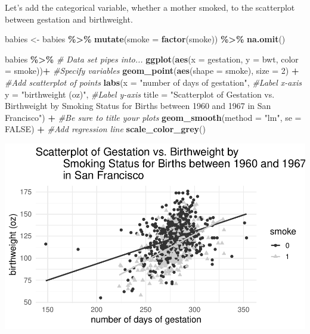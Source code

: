 \documentclass[
]{report}
\newenvironment{Shaded}{\begin{snugshade}}{\end{snugshade}}
\newcommand{\AttributeTok}[1]{\textcolor[rgb]{0.13,0.29,0.53}{#1}}
\newcommand{\CommentTok}[1]{\textcolor[rgb]{0.56,0.35,0.01}{\textit{#1}}}
\newcommand{\ConstantTok}[1]{\textcolor[rgb]{0.56,0.35,0.01}{#1}}
\newcommand{\DecValTok}[1]{\textcolor[rgb]{0.00,0.00,0.81}{#1}}
\newcommand{\FunctionTok}[1]{\textcolor[rgb]{0.13,0.29,0.53}{\textbf{#1}}}
\newcommand{\NormalTok}[1]{#1}
\newcommand{\OtherTok}[1]{\textcolor[rgb]{0.56,0.35,0.01}{#1}}
\newcommand{\SpecialCharTok}[1]{\textcolor[rgb]{0.81,0.36,0.00}{\textbf{#1}}}
\newcommand{\StringTok}[1]{\textcolor[rgb]{0.31,0.60,0.02}{#1}}
\begin{document}
\newpage

Let's add the categorical variable, whether a mother smoked, to the scatterplot between gestation and birthweight.

\begin{Shaded}
\begin{Highlighting}[]
\NormalTok{babies }\OtherTok{\textless{}{-}}\NormalTok{ babies }\SpecialCharTok{\%\textgreater{}\%} 
    \FunctionTok{mutate}\NormalTok{(}\AttributeTok{smoke =} \FunctionTok{factor}\NormalTok{(smoke)) }\SpecialCharTok{\%\textgreater{}\%}
    \FunctionTok{na.omit}\NormalTok{()}
           
\NormalTok{babies }\SpecialCharTok{\%\textgreater{}\%} \CommentTok{\# Data set pipes into...}
    \FunctionTok{ggplot}\NormalTok{(}\FunctionTok{aes}\NormalTok{(}\AttributeTok{x =}\NormalTok{ gestation, }\AttributeTok{y =}\NormalTok{ bwt, }\AttributeTok{color =}\NormalTok{ smoke))}\SpecialCharTok{+}  \CommentTok{\#Specify variables}
    \FunctionTok{geom\_point}\NormalTok{(}\FunctionTok{aes}\NormalTok{(}\AttributeTok{shape =}\NormalTok{ smoke), }\AttributeTok{size =} \DecValTok{2}\NormalTok{) }\SpecialCharTok{+}  \CommentTok{\#Add scatterplot of points}
    \FunctionTok{labs}\NormalTok{(}\AttributeTok{x =} \StringTok{"number of days of gestation"}\NormalTok{,  }\CommentTok{\#Label x{-}axis}
         \AttributeTok{y =} \StringTok{"birthweight (oz)"}\NormalTok{,  }\CommentTok{\#Label y{-}axis}
         \AttributeTok{title =} \StringTok{"Scatterplot of Gestation vs. Birthweight by }
\StringTok{         Smoking Status for Births between 1960 and 1967 }
\StringTok{         in San Francisco"}\NormalTok{) }\SpecialCharTok{+} 
    \CommentTok{\#Be sure to title your plots}
    \FunctionTok{geom\_smooth}\NormalTok{(}\AttributeTok{method =} \StringTok{"lm"}\NormalTok{, }\AttributeTok{se =} \ConstantTok{FALSE}\NormalTok{) }\SpecialCharTok{+} \CommentTok{\#Add regression line}
    \FunctionTok{scale\_color\_grey}\NormalTok{()}
\end{Highlighting}
\end{Shaded}

\begin{center}\includegraphics[width=0.8\linewidth]{13-VN13-regression_files/figure-latex/unnamed-chunk-8-1} \end{center}
\end{document}
